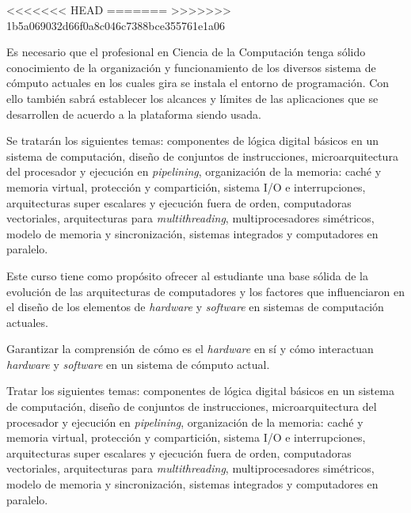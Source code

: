 \begin{syllabus}

<<<<<<< HEAD
=======
>>>>>>> 1b5a069032d66f0a8c046c7388bce355761e1a06

\begin{justification}
Es necesario que el profesional en Ciencia de la Computación tenga sólido  conocimiento de la organización y funcionamiento de los diversos sistema de cómputo actuales en los cuales gira se instala el entorno de programación. Con ello también sabrá establecer los alcances y límites de las aplicaciones que se desarrollen de acuerdo a la plataforma siendo usada.

Se tratarán los siguientes temas: componentes de lógica digital básicos en un sistema de computación, diseño de conjuntos de instrucciones, microarquitectura del procesador y ejecución en \textit{pipelining}, organización de la memoria: caché y memoria virtual, protección y compartición, sistema I/O e interrupciones, arquitecturas super escalares y ejecución fuera de orden, computadoras vectoriales, arquitecturas para \textit{multithreading}, multiprocesadores simétricos, modelo de memoria y sincronización, sistemas integrados y computadores en paralelo.

\end{justification}

\begin{goals}
\item Este curso tiene como propósito ofrecer al estudiante una base sólida de la evolución de las arquitecturas de computadores y los factores que influenciaron en el diseño de los elementos de \textit{hardware} y \textit{software} en sistemas de computación actuales. 
\item Garantizar la comprensión de cómo es el \textit{hardware} en sí y cómo interactuan \textit{hardware} y \textit{software} en un sistema de cómputo actual.
\item Tratar los siguientes temas: componentes de lógica digital básicos en un sistema de computación, diseño de conjuntos de instrucciones, microarquitectura del procesador y ejecución en \textit{pipelining}, organización de la memoria: caché y memoria virtual, protección y compartición, sistema I/O e interrupciones, arquitecturas super escalares y ejecución fuera de orden, computadoras vectoriales, arquitecturas para \textit{multithreading}, multiprocesadores simétricos, modelo de memoria y sincronización, sistemas integrados y computadores en paralelo.
\end{goals}


\end{syllabus}
